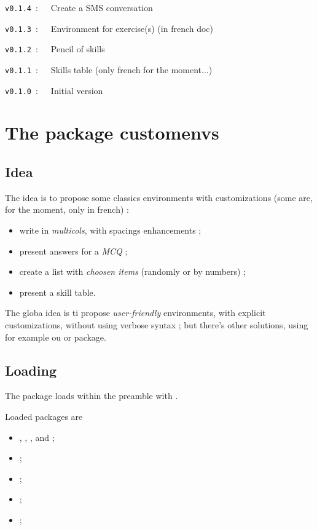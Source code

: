 \documentclass[english,11pt,a4paper]{article}
\begin{document}
\verb|v0.1.4|~:~~~Create a SMS conversation

\verb|v0.1.3|~:~~~Environment for exercise(s) (in french doc)

\verb|v0.1.2|~:~~~Pencil of skills

\verb|v0.1.1|~:~~~Skills table (only french for the moment...)

\verb|v0.1.0|~:~~~Initial version

\vspace*{5mm}

\pagebreak

\section{The package customenvs}

\subsection{Idea}

The idea is to propose some classics environments with customizations (some are, for the moment, only in french) :

\begin{itemize}
	\item write in \textit{multicols}, with spacings enhancements ;
	\item present answers for a \textit{MCQ} ;
	\item create a list with \textit{choosen items} (randomly or by numbers) ;
	\item present a skill table.
\end{itemize}

\smallskip

The globa idea is ti propose \textit{user-friendly} environments, with explicit customizations, without using verbose syntax ; but there's other solutions, using for example  ou  or  package.

\subsection{Loading}

The package loads within the preamble with .

Loaded packages are 

\begin{itemize}
	\item {}, , ,  and  ;
	\item {} ;
	\item {} ;
	\item {} ;
	\item {} ;
\end{itemize}
\end{document}
